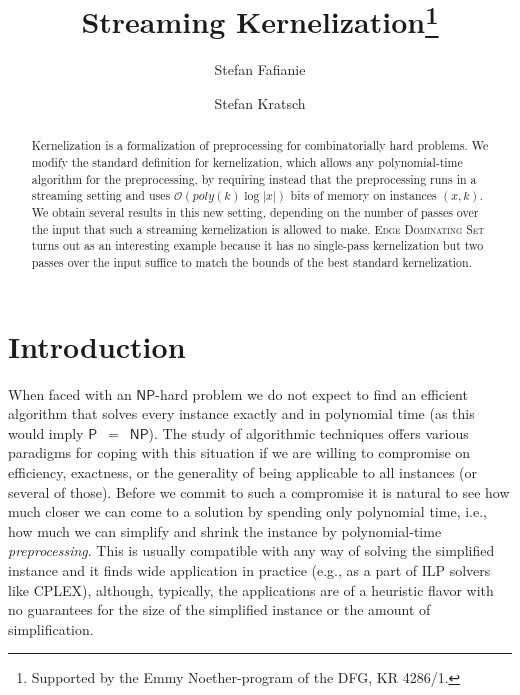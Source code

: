 \documentclass[draft,a4paper]{llncs}
\title{\texorpdfstring{Streaming Kernelization\thanks{Supported by the Emmy Noether-program of the DFG, KR 4286/1.}}{Streaming Kernelization}}
\author{Stefan Fafianie \and Stefan Kratsch}
\institute{TU Berlin, Germany, \texttt{$\{$stefan.fafianie,stefan.kratsch$\}$@tu-berlin.de}}
\newcommand{\Oh}{\mathcal{O}}
\newcommand{\NP}{\ensuremath{\mathsf{NP}}\xspace}
\renewcommand{\P}{\ensuremath{\mathsf{P}}\xspace}
\begin{document}
\maketitle

\begin{abstract}
Kernelization is a formalization of preprocessing for combinatorially hard problems. We modify the standard definition for kernelization, which allows any polynomial-time algorithm for the preprocessing, by requiring instead that the preprocessing runs in a streaming setting and uses $\Oh(poly(k)\log|x|)$ bits of memory on instances $(x,k)$. We obtain several results in this new setting, depending on the number of passes over the input that such a streaming kernelization is allowed to make. \textsc{Edge Dominating Set} turns out as an interesting example because it has no single-pass kernelization but two passes over the input suffice to match the bounds of the best standard kernelization. 

\end{abstract}

\section{Introduction}

When faced with an \NP-hard problem we do not expect to find an efficient algorithm that solves every instance exactly and in polynomial time (as this would imply \P~$=$~\NP). The study of algorithmic techniques offers various paradigms for coping with this situation if we are willing to compromise on efficiency, exactness, or the generality of being applicable to all instances (or several of those). Before we commit to such a compromise it is natural to see how much closer we can come to a solution by spending only polynomial time, i.e., how much we can simplify and shrink the instance by polynomial-time \emph{preprocessing}. This is usually compatible with any way of solving the simplified instance and it finds wide application in practice (e.g., as a part of ILP solvers like CPLEX), although, typically, the applications are of a heuristic flavor with no guarantees for the size of the simplified instance or the amount of simplification.
\end{document}

